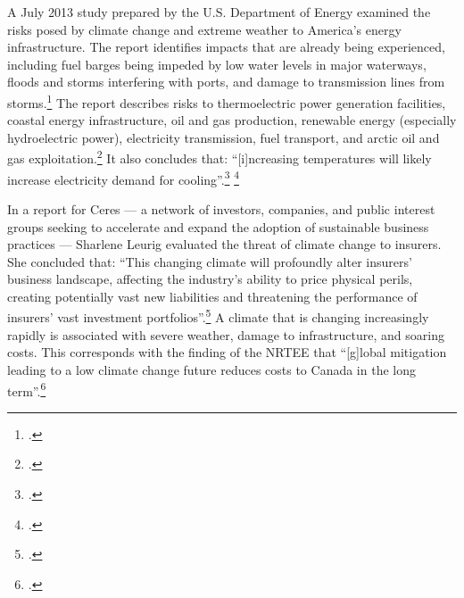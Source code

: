 \documentclass[10pt]{article}
\begin{document}
A July 2013 study prepared by the U.S. Department of Energy examined the risks posed by climate change and extreme weather to America's energy infrastructure.
The report identifies impacts that are already being experienced, including fuel barges being impeded by low water levels in major waterways, floods and storms interfering with ports, and damage to transmission lines from storms.\footcite[][]{EnergyBreakdowns}
The report describes risks to thermoelectric power generation facilities, coastal energy infrastructure, oil and gas production, renewable energy (especially hydroelectric power), electricity transmission, fuel transport, and arctic oil and gas exploitation.\footcite[][p. I]{EnergySectorVulnerabilities}
It also concludes that: ``[i]ncreasing temperatures will likely increase electricity demand for cooling''.\footcite[][p. I]{EnergySectorVulnerabilities} \footcite[See also: ][]{USEffectsOnEnergy}



In a report for Ceres --- a  network of investors, companies, and public interest groups seeking to accelerate and expand the adoption of sustainable business practices --- Sharlene Leurig evaluated the threat of climate change to insurers.
She concluded that: ``This changing climate will profoundly alter insurers' business landscape, affecting the industry's ability to price physical perils, creating potentially vast new liabilities and threatening the performance of insurers' vast investment portfolios''.\footcite[][p. 9]{ClimateRiskInsurers}
A climate that is changing increasingly rapidly is associated with severe weather, damage to infrastructure, and soaring costs.
This corresponds with the finding of the NRTEE that ``[g]lobal mitigation leading to a low climate change future reduces costs to Canada in the long term''.\footcite[][p. 16]{NRTEEPrice}
\end{document}
